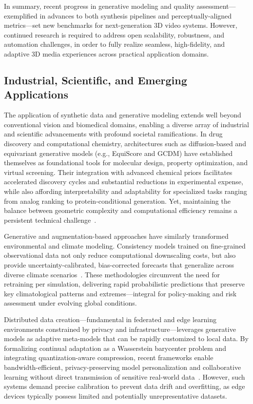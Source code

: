 \documentclass[sigconf]{acmart}
\begin{document}
In summary, recent progress in generative modeling and quality assessment—exemplified in advances to both synthesis pipelines and perceptually-aligned metrics—set new benchmarks for next-generation 3D video systems. However, continued research is required to address open scalability, robustness, and automation challenges, in order to fully realize seamless, high-fidelity, and adaptive 3D media experiences across practical application domains.

\subsection{Industrial, Scientific, and Emerging Applications}

The application of synthetic data and generative modeling extends well beyond conventional vision and biomedical domains, enabling a diverse array of industrial and scientific advancements with profound societal ramifications. In drug discovery and computational chemistry, architectures such as diffusion-based and equivariant generative models (e.g., EquiScore and GCDM) have established themselves as foundational tools for molecular design, property optimization, and virtual screening. Their integration with advanced chemical priors facilitates accelerated discovery cycles and substantial reductions in experimental expense, while also affording interpretability and adaptability for specialized tasks ranging from analog ranking to protein-conditional generation. Yet, maintaining the balance between geometric complexity and computational efficiency remains a persistent technical challenge~\cite{ref59,ref74}.

Generative and augmentation-based approaches have similarly transformed environmental and climate modeling. Consistency models trained on fine-grained observational data not only reduce computational downscaling costs, but also provide uncertainty-calibrated, bias-corrected forecasts that generalize across diverse climate scenarios~\cite{ref73}. These methodologies circumvent the need for retraining per simulation, delivering rapid probabilistic predictions that preserve key climatological patterns and extremes—integral for policy-making and risk assessment under evolving global conditions.

Distributed data creation—fundamental in federated and edge learning environments constrained by privacy and infrastructure—leverages generative models as adaptive meta-models that can be rapidly customized to local data. By formalizing continual adaptation as a Wasserstein barycenter problem and integrating quantization-aware compression, recent frameworks enable bandwidth-efficient, privacy-preserving model personalization and collaborative learning without direct transmission of sensitive real-world data~\cite{ref72}. However, such systems demand precise calibration to prevent data drift and overfitting, as edge devices typically possess limited and potentially unrepresentative datasets.
\end{document}
